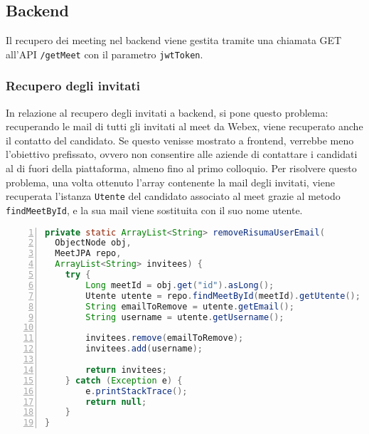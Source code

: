 \subsection{Backend}
Il recupero dei meeting nel backend viene gestita tramite una chiamata 
GET all'API \texttt{\//getMeet} con il parametro \texttt{jwtToken}.

\clearpage


\subsubsection{Recupero degli invitati}
\label{sec:recupero_invitati_backend}
In relazione al recupero degli invitati a backend, si pone questo problema: recuperando le mail di tutti
gli invitati al meet da Webex, viene recuperato anche il contatto del candidato. Se questo venisse mostrato 
a frontend, verrebbe meno l'obiettivo prefissato, ovvero non consentire alle aziende di contattare i candidati
al di fuori della piattaforma, almeno fino al primo colloquio. Per risolvere questo problema, una volta 
ottenuto l'array contenente la mail degli invitati, viene recuperata l'istanza \texttt{Utente} del candidato
associato al meet grazie al metodo \texttt{findMeetById}, e la sua mail viene sostituita con il suo nome utente.
\begin{lstlisting}[language=java, frame=lines, basicstyle=\ttfamily\scriptsize, numbers=left]
private static ArrayList<String> removeRisumaUserEmail(
  ObjectNode obj, 
  MeetJPA repo, 
  ArrayList<String> invitees) {
	try {
		Long meetId = obj.get("id").asLong();
		Utente utente = repo.findMeetById(meetId).getUtente();
		String emailToRemove = utente.getEmail();
		String username = utente.getUsername();
		
		invitees.remove(emailToRemove);
		invitees.add(username);
			
		return invitees;
	} catch (Exception e) {
		e.printStackTrace();
		return null;
	}
}
\end{lstlisting}
